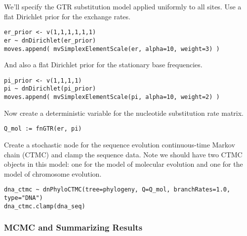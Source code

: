 We'll specify the GTR substitution model applied uniformly to all sites.
Use a flat Dirichlet prior for the exchange rates.
{\tt \begin{snugshade*}
\begin{lstlisting}
er_prior <- v(1,1,1,1,1,1)
er ~ dnDirichlet(er_prior)
moves.append( mvSimplexElementScale(er, alpha=10, weight=3) )
\end{lstlisting}
\end{snugshade*}}
And also a flat Dirichlet prior for the stationary base frequencies.
{\tt \begin{snugshade*}
\begin{lstlisting}
pi_prior <- v(1,1,1,1)
pi ~ dnDirichlet(pi_prior)
moves.append( mvSimplexElementScale(pi, alpha=10, weight=2) )
\end{lstlisting}
\end{snugshade*}}
Now create a deterministic variable for the nucleotide substitution rate matrix.
{\tt \begin{snugshade*}
\begin{lstlisting}
Q_mol := fnGTR(er, pi)
\end{lstlisting}
\end{snugshade*}}
Create a stochastic node for the sequence evolution continuous-time Markov chain (CTMC)
and clamp the sequence data.
Note we should have two CTMC objects in this model: one for the model of molecular evolution
and one for the model of chromosome evolution.
{\tt \begin{snugshade*}
\begin{lstlisting}
dna_ctmc ~ dnPhyloCTMC(tree=phylogeny, Q=Q_mol, branchRates=1.0, type="DNA")
dna_ctmc.clamp(dna_seq)
\end{lstlisting}
\end{snugshade*}}

\subsubsection{MCMC and Summarizing Results}

